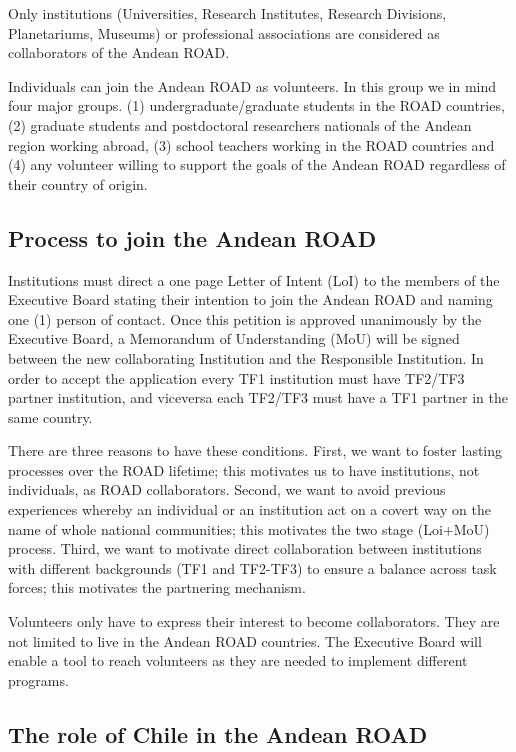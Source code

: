 \documentclass[12pt]{article}
\begin{document}
Only institutions (Universities, Research Institutes, Research
Divisions, Planetariums, Museums) or professional associations are
considered as collaborators of the Andean ROAD. 

Individuals can join the Andean ROAD as volunteers. In this group we
in mind four major groups. (1) undergraduate/graduate students in the
ROAD countries, (2) graduate students and postdoctoral researchers
nationals of the Andean region working abroad, (3) school teachers
working in the ROAD countries and (4) any volunteer willing to support
the goals of the Andean ROAD regardless of their country of origin. 


\subsection*{Process to join the Andean ROAD}

Institutions must direct a one page Letter of Intent (LoI) to the
members of the Executive Board stating their intention to join the
Andean ROAD and naming one (1) person of contact. Once this petition
is approved unanimously by the Executive Board, a Memorandum of
Understanding (MoU) will be signed between the new collaborating Institution
and the Responsible Institution. In order to accept the application
every TF1 institution must have TF2/TF3 partner institution,
and viceversa each TF2/TF3 must have a TF1 partner in the same
country. 

There are three reasons to have these conditions. First, we want to
foster lasting processes over the ROAD lifetime; this motivates us to
have institutions, not individuals, as ROAD collaborators. Second, we want
to avoid previous experiences whereby an individual or an institution
act on a covert way on the name of whole national communities; this
motivates the two stage (Loi+MoU) process. Third, we want to motivate
direct collaboration between institutions with different backgrounds
(TF1 and TF2-TF3) to ensure a balance across task forces; this
motivates the partnering mechanism.  

Volunteers only have to express their interest to become
collaborators. They are not limited to live in the Andean ROAD
countries. The Executive Board will enable a tool to reach volunteers
as they are needed to implement different programs.  

\subsection*{The role of Chile in the Andean ROAD}
\end{document}
